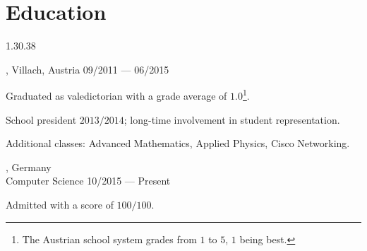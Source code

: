 \section{Education}{1.3}{0.38}
\begin{entry}
	{, Villach, Austria}{}
	{09/2011 --- 06/2015}
	\item Graduated as valedictorian with a grade average of $1.0$\footnote{The Austrian school system grades from $1$ to $5$, $1$ being best.}.
	\item School president $2013/2014$; long-time involvement in student representation.
	\item Additional classes: Advanced Mathematics, Applied Physics, Cisco Networking.
\end{entry}
\begin{entry}
	{, Germany}
	{\\Computer Science}
	{10/2015 --- Present}
	\item Admitted with a score of $100/100$.
\end{entry}


